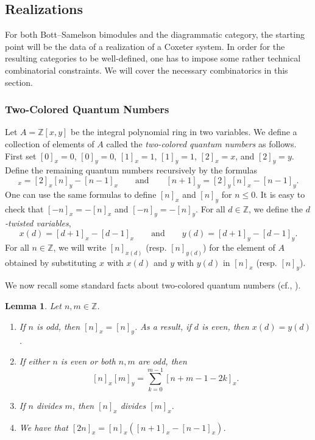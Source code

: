 \documentclass{amsart}
\newcommand{\Z}{\mathbb{Z}}
\newtheorem{lemma}[subsubsection]{Lemma}
\theoremstyle{definition}
\numberwithin{equation}{subsection}
\begin{document}
\subsection{Realizations}

For both Bott--Samelson bimodules and the diagrammatic category, the starting point will be the data of a realization of a Coxeter system.
In order for the resulting categories to be well-defined, one has to impose some rather technical combinatorial constraints.
We will cover the necessary combinatorics in this section.

\subsubsection{Two-Colored Quantum Numbers}

Let $A = \Z [x,y]$ be the integral polynomial ring in two variables.
We define a collection of elements of $A$ called the \emph{two-colored quantum numbers} as follows.
First set $[0]_x = 0$, $[0]_y = 0$, $[1]_x = 1$, $[1]_y = 1$, $[2]_x = x$, and $[2]_y = y$.
Define the remaining quantum numbers recursively by the formulas
\begin{equation}
    [n+1]_x = [2]_x [n]_y - [n-1]_x \qquad \text{and} \qquad [n+1]_y = [2]_y [n]_x - [n-1]_y.
\end{equation}
One can use the same formulas to define $[n]_x$ and $[n]_y$ for $n \leq 0$. It is easy to check that $[-n]_x = -[n]_x$ and $[-n]_y = - [n]_y$.
For all $d \in \Z$, we define the \emph{$d$-twisted variables}, 
\[ x(d) = [d+1]_x - [d-1]_x \qquad \text{and} \qquad y(d) = [d+1]_y - [d-1]_y.\]
For all $n \in \Z$, we will write $[n]_{x(d)}$ (resp. $[n]_{y(d)}$) for the element of $A$ obtained by substituting $x$ with $x(d)$ and $y$ with $y(d)$ in $[n]_{x}$ (resp. $[n]_y$).

We now recall some standard facts about two-colored quantum numbers (cf., \cite{Elib, EW, EW17}).

\begin{lemma}\label{lem:facts_about_quantum_numbers}
    Let $n, m \in \Z$.
    \begin{enumerate}
        \item If $n$ is odd, then $[n]_x = [n]_y$. As a result, if $d$ is even, then $x(d) = y(d)$.
        \item If either $n$ is even or both $n, m$ are odd, then
        \[[n]_x [m]_y = \sum_{k=0}^{m-1} [n+m-1-2k]_x.\]
        \item If $n$ divides $m$, then $[n]_x$ divides $[m]_x$.
        \item We have that $[2n]_x = [n]_x ([n+1]_x - [n-1]_x)$.
    \end{enumerate}
\end{lemma}
\end{document}
